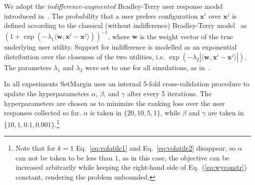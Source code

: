 \documentclass{article}
\renewcommand\[{\begin{equation}}
\renewcommand\]{\end{equation}}
\newcommand{\vecvar}[1]{\ensuremath{\boldsymbol{#1}}}
\newcommand{\vw}{\vecvar{w}}
\newcommand{\vx}{\vecvar{x}}
\begin{document}
We adopt the {\em indifference-augmented} Bradley-Terry user response
model introduced in~\cite{guo2010real}. The probability that a user
prefers configuration $\vx^i$ over $\vx^j$ is defined according to the
classical (without indifference) Bradley-Terry model~\cite{BraTer52} as
$ (1 + \exp(-\lambda_1 \langle\vw,\vx^i - \vx^j\rangle))^{-1} $,
where $\vw$ is the weight vector of the true underlying user utility.
Support for indifference is modelled as an exponential distribution
over the closeness of the two utilities, i.e. 
$ \exp(-\lambda_2 |\langle\vw,\vx^i - \vx^j\rangle|).$
The parameters $\lambda_1$ and $\lambda_2$ were set to one for all
simulations, as in~\cite{guo2010real}.

In all experiments {\sc SetMargin} uses an internal 5-fold cross-validation procedure to
update the hyperparameters $\alpha$, $\beta$, and $\gamma$ after every 5
iterations. The hyperparameters are chosen as to minimize the ranking loss over
the user responses collected so far. $\alpha$ is taken in $\{20, 10, 5, 1\}$,
while $\beta$ and $\gamma$ are taken in $\{10, 1, 0.1, 0.001\}$.\footnote{Note
that for $k=1$ Eq.~\ref{eq:volatile1} and Eq.~\ref{eq:volatile2} disappear,
so $\alpha$ can not be taken to be less than $1$, as in this case, the
objective can be increased arbitrarily while keeping the right-hand side of
Eq.~(\ref{eq:wyconstr}) constant, rendering the problem unbounded.}
\end{document}
